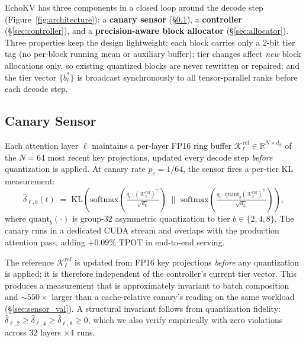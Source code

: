 \documentclass{article}
\begin{document}
EchoKV has three components in a closed loop around the decode step
(Figure~\ref{fig:architecture}): a \textbf{canary sensor}
(\S\ref{sec:canary}), a \textbf{controller} (\S\ref{sec:controller}),
and a \textbf{precision-aware block allocator} (\S\ref{sec:allocator}).
Three properties keep the design lightweight: each block carries only a
$2$-bit tier tag (no per-block running mean or auxiliary buffer); tier
changes affect \emph{new} block allocations only, so existing quantized
blocks are never rewritten or repaired; and the tier vector
$\{b_\ell^*\}$ is broadcast synchronously to all tensor-parallel ranks
before each decode step.

\subsection{Canary Sensor}
\label{sec:canary}

Each attention layer $\ell$ maintains a per-layer FP16 ring buffer
$\mathcal{K}_\ell^{\mathrm{ref}} \in \mathbb{R}^{N \times d_k}$ of the
$N{=}64$ most recent key projections, updated every decode step
\emph{before} quantization is applied. At canary rate $p_c{=}1/64$, the
sensor fires a per-tier KL measurement:
\begin{equation}
  \hat{\delta}_{\ell,b}(t) \;=\;
    \mathrm{KL}\!\left(
      \mathrm{softmax}\!\left(\tfrac{q_t \cdot (\mathcal{K}_\ell^{\mathrm{ref}})^\top}{\sqrt{d_k}}\right)
      \;\Big\|\;
      \mathrm{softmax}\!\left(\tfrac{q_t \cdot \mathrm{quant}_b(\mathcal{K}_\ell^{\mathrm{ref}})^\top}{\sqrt{d_k}}\right)
    \right),
  \label{eq:canary}
\end{equation}
where $\mathrm{quant}_b(\cdot)$ is group-$32$ asymmetric quantization to
tier $b \in \{2,4,8\}$. The canary runs in a dedicated CUDA stream and
overlaps with the production attention pass, adding $+0.09\%$ TPOT in
end-to-end serving.

The reference $\mathcal{K}_\ell^{\mathrm{ref}}$ is updated from FP16 key
projections \emph{before} any quantization is applied; it is therefore
independent of the controller's current tier vector. This produces a
measurement that is approximately invariant to batch composition and
${\sim}550\times$ larger than a cache-relative canary's reading on the
same workload (\S\ref{sec:sensor_val}). A structural invariant follows
from quantization fidelity:
$\hat{\delta}_{\ell,2} \ge \hat{\delta}_{\ell,4} \ge \hat{\delta}_{\ell,8} \ge 0$,
which we also verify empirically with zero violations across $32$ layers
$\times 4$ runs.
\end{document}
